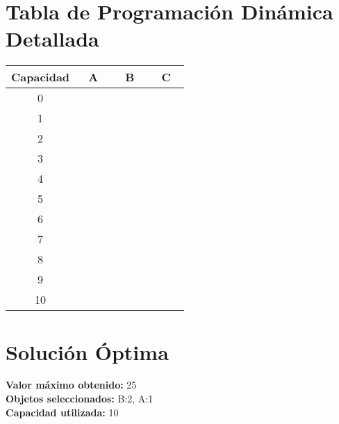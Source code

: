 \documentclass{article}
\begin{document}
\section*{Tabla de Programación Dinámica Detallada}
\begin{center}
\scriptsize
\begin{tabular}{|c|c|c|c|}
\hline
Capacidad & A & B & C \\ \hline
0 & \cellcolor{rojo}\textcolor{white}{0} & \cellcolor{rojo}\textcolor{white}{0} & \cellcolor{rojo}\textcolor{white}{0} \\ \hline
1 & \cellcolor{rojo}\textcolor{white}{0} & \cellcolor{rojo}\textcolor{white}{0} & \cellcolor{rojo}\textcolor{white}{0} \\ \hline
2 & \cellcolor{rojo}\textcolor{white}{0} & \cellcolor{rojo}\textcolor{white}{0} & \cellcolor{rojo}\textcolor{white}{0} \\ \hline
3 & \cellcolor{rojo}\textcolor{white}{0} & \cellcolor{verde}\textcolor{white}{7(1)} & \cellcolor{rojo}\textcolor{white}{7} \\ \hline
4 & \cellcolor{verde}\textcolor{white}{11(1)} & \cellcolor{rojo}\textcolor{white}{11} & \cellcolor{rojo}\textcolor{white}{11} \\ \hline
5 & \cellcolor{verde}\textcolor{white}{11(1)} & \cellcolor{rojo}\textcolor{white}{11} & \cellcolor{verde}\textcolor{white}{12(1)} \\ \hline
6 & \cellcolor{verde}\textcolor{white}{11(1)} & \cellcolor{verde}\textcolor{white}{14(2)} & \cellcolor{rojo}\textcolor{white}{14} \\ \hline
7 & \cellcolor{verde}\textcolor{white}{11(1)} & \cellcolor{verde}\textcolor{white}{18(1)} & \cellcolor{rojo}\textcolor{white}{18} \\ \hline
8 & \cellcolor{verde}\textcolor{white}{22(2)} & \cellcolor{rojo}\textcolor{white}{22} & \cellcolor{rojo}\textcolor{white}{22} \\ \hline
9 & \cellcolor{verde}\textcolor{white}{22(2)} & \cellcolor{rojo}\textcolor{white}{22} & \cellcolor{verde}\textcolor{white}{23(1)} \\ \hline
10 & \cellcolor{verde}\textcolor{white}{22(2)} & \cellcolor{verde}\textcolor{white}{25(2)} & \cellcolor{rojo}\textcolor{white}{25} \\ \hline
\end{tabular}
\end{center}
\normalsize

\section*{Solución Óptima}
\textbf{Valor máximo obtenido:} 25\\
\textbf{Objetos seleccionados:} B:2, A:1\\
\textbf{Capacidad utilizada:} 10\\
\end{document}
